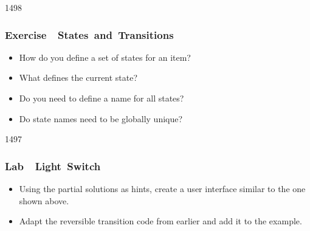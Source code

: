 \begin{slide}{1498}\frametitle{Exercise~\textendash~States~and~Transitions}

\begin{itemize}
\item How do you define a set of states for an item?
\item What defines the current state?
\item Do you need to define a name for all states?
\item Do state names need to be globally unique?
\end{itemize}

\end{slide}

\begin{slide}{1497}\frametitle{Lab~\textendash~Light~Switch}

\vspace*{-1em}
\begin{center}
\hspace*{0.5em}
\end{center}

\vspace*{-0.5em}
\begin{itemize}
\item Using the partial solutions as hints, create a user interface similar
to the one shown above.
\end{itemize}

\begin{center}
\hspace*{0.5em}
\hspace*{0.5em}
\end{center}

\vspace*{-0.5em}
\begin{itemize}
\item Adapt the reversible transition code from earlier and add it to the
example. 

\end{itemize}

\end{slide}

                                                                   

